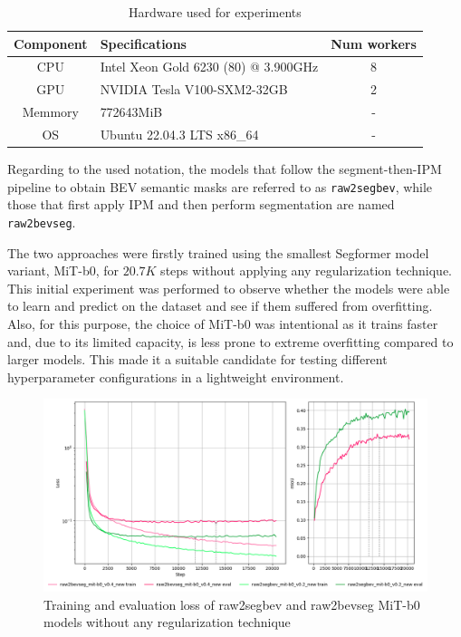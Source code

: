 \begin{table}[h]
    \centering
    \begin{tabular}{c l c}
        \toprule
        \textbf{Component} & \textbf{Specifications} & \textbf{Num workers} \\
        \midrule
        CPU         & Intel Xeon Gold 6230 (80) @ 3.900GHz & 8 \\
        GPU         & NVIDIA Tesla V100-SXM2-32GB & 2 \\      
        Memmory     & 772643MiB & - \\
        OS          & Ubuntu 22.04.3 LTS x86\_64 & - \\
        \bottomrule
    \end{tabular}
    \caption{ Hardware used for experiments }
    \label{tab:hardware}
\end{table}

Regarding to the used notation, the models that follow the segment-then-IPM pipeline to obtain BEV semantic masks are referred to as \texttt{raw2segbev}, while those that first apply IPM and then perform segmentation are named \texttt{raw2bevseg}.

The two approaches were firstly trained using the smallest Segformer model variant, MiT-b0, for $20.7K$ steps without applying any regularization technique. This initial experiment was performed to observe whether the models were able to learn and predict on the dataset and see if them suffered from overfitting. Also, for this purpose, the choice of MiT-b0 was intentional as it trains faster and, due to its limited capacity, is less prone to extreme overfitting compared to larger models. This made it a suitable candidate for testing different hyperparameter configurations in a lightweight environment.

\begin{figure}[h!]
    \centering
    \includegraphics[width=0.7\linewidth]{./images/experiments/overfitting_bev_nu.png}
    \caption{Training and evaluation loss of raw2segbev and raw2bevseg MiT-b0 models without any regularization technique}
    \label{fig:overfitting_mit-b0}
\end{figure}

